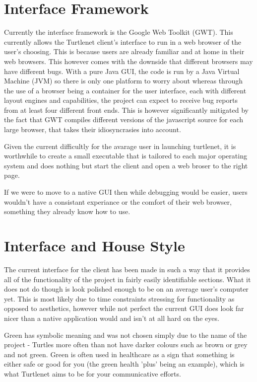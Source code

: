 \section{Interface Framework}
Currently the interface framework is the Google Web Toolkit (GWT).  This
currently allows the Turtlenet client's interface to run in a web browser of the
user's choosing.  This is because users are already familiar and at home in
their web browsers. This however comes with the downside that different browsers
may have different bugs. With a pure Java GUI, the code is run by a Java
Virtual Machine (JVM) so there is only one platform to worry about whereas
through the use of a browser being a container for the user interface, each with
different layout engines and capabilities, the project can expect to receive bug
reports from at least four different front ends. This is however significantly
mitigated by the fact that GWT compiles different versions of the javascript
source for each large browser, that takes their idiosyncrasies into account.

Given the current difficultly for the avarage user in launching turtlenet, it is
worthwhile to create a small executable that is tailored to each major operating
system and does nothing but start the client and open a web broser to the right
page.

If we were to move to a native GUI then while debugging would be easier, users
wouldn't have a consistant experiance or the comfort of their web browser,
something they already know how to use.

\section{Interface and House Style}
The current interface for the client has been made in such a way that it
provides all of the functionality of the project in fairly easily identifiable
sections.  What it does not do though is look polished enough to be on an
average user's computer yet.  This is most likely due to time constraints
stressing for functionality as opposed to aesthetics, however while not perfect
the current GUI does look far nicer than a native application would and isn't at
all hard on the eyes.

Green has symbolic meaning and was not chosen simply due to the name of the
project - Turtles more often than not have darker colours such as brown or grey
and not green.  Green is often used in healthcare as a sign that something is
either safe or good for you (the green health 'plus' being an example), which is
what Turtlenet aims to be for your communicative efforts.

